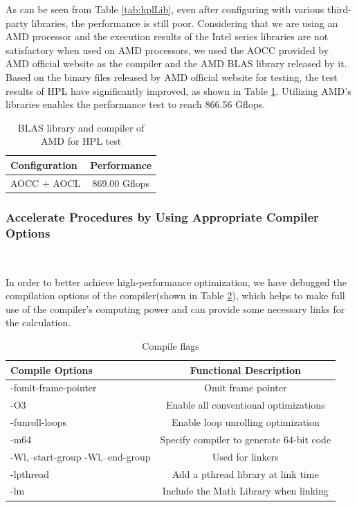 As can be seen from Table \ref{tab:hplLib}, even after configuring with various third-party libraries, the performance is still poor. 
Considering that we are using an AMD processor and the execution results of the Intel series libraries are not satisfactory when used on AMD processors, we used the AOCC
provided by AMD official website as the compiler and the AMD BLAS library released by it.
Based on the binary files released by AMD official website for testing, the  test results of HPL have significantly improved, as shown in Table \ref{tab:hplLib2}. 
Utilizing AMD’s libraries enables the performance test to reach 866.56 Gflops.

\begin{table}[htbp]
\centering
\caption{BLAS library and compiler of AMD for HPL test}
\label{tab:hplLib2}
\begin{tabular}{|>{\raggedright\arraybackslash}p{5cm}|c|}
\hline
\rowcolor{lightgray}
\textbf{Configuration} & \textbf{Performance} \\
\hline
AOCC + AOCL&  869.00 Gflops\\
\hline
\end{tabular}
\end{table}


\subsubsection{Accelerate Procedures by Using Appropriate Compiler Options}
\ 

In order to better achieve high-performance optimization, we have debugged the compilation options of the compiler(shown in Table \ref{tab:hplComp}), which helps to make full use of the compiler’s computing power and can provide some necessary links for the calculation.

\begin{table}[htbp]
\centering
\caption{Compile flags}
\label{tab:hplComp}
\begin{tabular}{|>{\raggedright\arraybackslash}p{5cm}|c|}
\hline 
\rowcolor{lightgray}
\textbf{Compile Options} & \textbf{Functional Description} \\
\hline
-fomit-frame-pointer&  Omit frame pointer\\
\hline
-O3 & Enable all conventional optimizations\\
\hline
-funroll-loops & Enable loop unrolling optimization\\
\hline
-m64&  Specify compiler to generate 64-bit code\\
\hline
-Wl,–start-group -Wl,–end-group & Used for linkers\\
\hline
-lpthread & Add a pthread library at link time\\
\hline
-lm & Include the Math Library when linking\\
\hline
\end{tabular}
\end{table}
